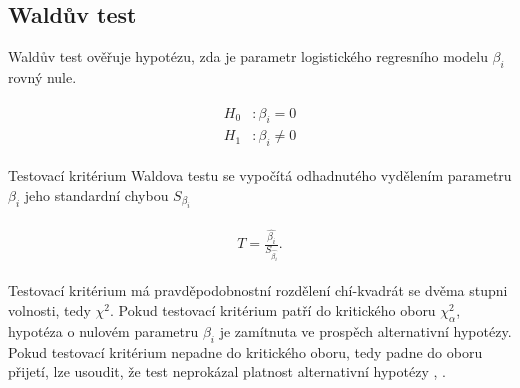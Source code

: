 \subsection{Waldův test}
Waldův test ověřuje hypotézu, zda je parametr logistického regresního modelu $\beta_i$ rovný nule.

\begin{align}
    \begin{split}
        H_0 &: \beta_i = 0 \\
        H_1 &: \beta_i \neq 0
    \end{split}
\end{align}

Testovací kritérium Waldova testu se vypočítá odhadnutého vydělením parametru $\beta_i$ jeho standardní chybou $S_{\beta_i}$

\begin{align}
    \begin{split}
        T = \frac{\hat{\beta_i}}{S_{\hat{\beta_i}}}.
    \end{split}
\end{align}

Testovací kritérium má pravděpodobnostní rozdělení chí-kvadrát se dvěma stupni volnosti, tedy $\chi^2$. Pokud testovací kritérium patří do 
kritického oboru $\chi^2_\alpha$, hypotéza o nulovém parametru $\beta_i$ je zamítnuta ve prospěch alternativní hypotézy. Pokud testovací kritérium nepadne do kritického oboru,
tedy padne do oboru přijetí, lze usoudit, že test neprokázal platnost alternativní hypotézy \cite{kleinbaum_logistic_2010}, \cite{powers_statistical_2000}.